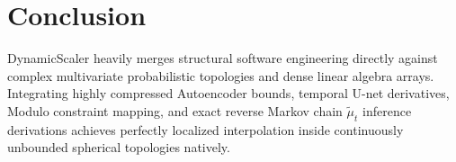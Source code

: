 \documentclass[11pt,a4paper]{article}
\begin{document}
\section{Conclusion}
DynamicScaler heavily merges structural software engineering directly against complex multivariate probabilistic topologies and dense linear algebra arrays. Integrating highly compressed Autoencoder bounds, temporal U-net derivatives, Modulo constraint mapping, and exact reverse Markov chain $\tilde{\mu}_t$ inference derivations achieves perfectly localized interpolation inside continuously unbounded spherical topologies natively.
\end{document}
